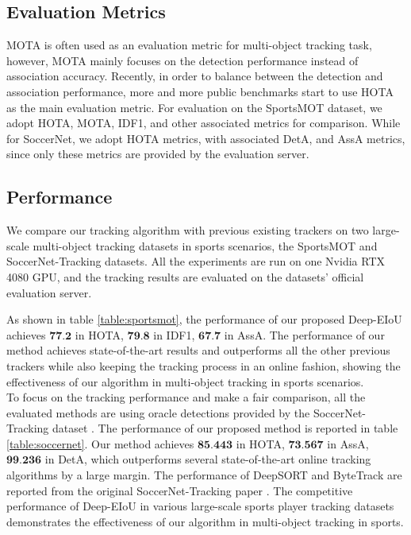 \documentclass[10pt,twocolumn,letterpaper]{article}
\begin{document}
\subsection{Evaluation Metrics}
MOTA \cite{mota} is often used as an evaluation metric for multi-object tracking task, however, MOTA mainly focuses on the detection performance instead of association accuracy. Recently, in order to balance between the detection and association performance, more and more public benchmarks start to use HOTA \cite{luiten2021hota} as the main evaluation metric. For evaluation on the SportsMOT dataset, we adopt HOTA, MOTA, IDF1, and other associated metrics \cite{bernardin2008evaluating} for comparison. While for SoccerNet, we adopt HOTA metrics, with associated DetA, and AssA metrics, since only these metrics are provided by the evaluation server.


\subsection{Performance}
We compare our tracking algorithm with previous existing trackers on two large-scale multi-object tracking datasets in sports scenarios, the SportsMOT and SoccerNet-Tracking datasets. All the experiments are run on one Nvidia RTX 4080 GPU, and the tracking results are evaluated on the datasets' official evaluation server.

 As shown in table \ref{table:sportsmot}, the performance of our proposed Deep-EIoU achieves $\textbf{77.2}$ in HOTA, $\textbf{79.8}$ in IDF1, $\textbf{67.7}$ in AssA. The performance of our method achieves state-of-the-art results and outperforms all the other previous trackers while also keeping the tracking process in an online fashion, showing the effectiveness of our algorithm in multi-object tracking in sports scenarios.\\

 To focus on the tracking performance and make a fair comparison, all the evaluated methods are using oracle detections provided by the SoccerNet-Tracking dataset \cite{cioppa2022soccernet}. The performance of our proposed method is reported in table \ref{table:soccernet}. Our method achieves $\textbf{85.443}$ in HOTA, $\textbf{73.567}$ in AssA, $\textbf{99.236}$ in DetA, which outperforms several state-of-the-art online tracking algorithms by a large margin. The performance of DeepSORT and ByteTrack are reported from the original SoccerNet-Tracking paper \cite{cioppa2022soccernet}. The competitive performance of Deep-EIoU in various large-scale sports player tracking datasets demonstrates the effectiveness of our algorithm in multi-object tracking in sports.
\end{document}
